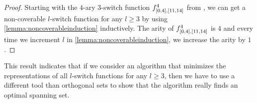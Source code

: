 \begin{proof}
Starting with the $4$-ary
$3$-switch function $f^{4}_{[0, 4], [11, 14]}$ from \citet{Dubovsky2012},
we can get a non-coverable $l$-switch function for any $l \geq 3$
by using \cref{lemma:noncoverableinduction} inductively.
The arity of $f^{4}_{[0, 4], [11, 14]}$ is $4$
and every time we increment $l$ in \cref{lemma:noncoverableinduction},
we increase the arity by $1$.
\end{proof}

This result indicates that
if we consider an algorithm that minimizes the representations of all $l$-switch functions for any $l \geq 3$,
then we have to use a different tool than orthogonal sets to show that the algorithm really finds an optimal spanning set.

